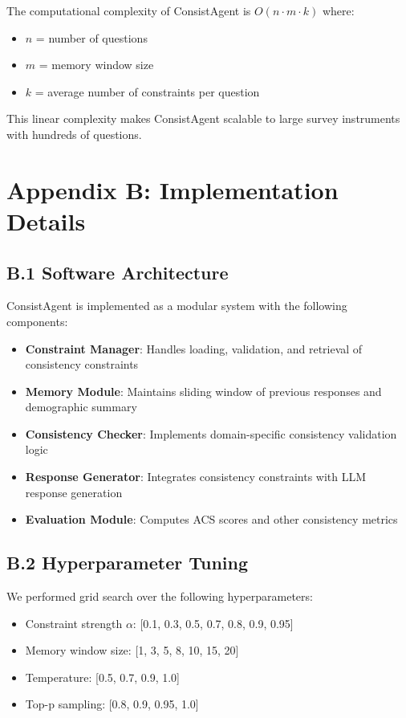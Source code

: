 \documentclass[sigconf, anonymous]{acmart}
\begin{document}
The computational complexity of ConsistAgent is $O(n \cdot m \cdot k)$ where:
\begin{itemize}
    \item $n$ = number of questions
    \item $m$ = memory window size
    \item $k$ = average number of constraints per question
\end{itemize}

This linear complexity makes ConsistAgent scalable to large survey instruments with hundreds of questions.

\newpage
\section*{Appendix B: Implementation Details}

\subsection*{B.1 Software Architecture}

ConsistAgent is implemented as a modular system with the following components:

\begin{itemize}
    \item \textbf{Constraint Manager}: Handles loading, validation, and retrieval of consistency constraints
    \item \textbf{Memory Module}: Maintains sliding window of previous responses and demographic summary
    \item \textbf{Consistency Checker}: Implements domain-specific consistency validation logic
    \item \textbf{Response Generator}: Integrates consistency constraints with LLM response generation
    \item \textbf{Evaluation Module}: Computes ACS scores and other consistency metrics
\end{itemize}

\subsection*{B.2 Hyperparameter Tuning}

We performed grid search over the following hyperparameters:

\begin{itemize}
    \item Constraint strength $\alpha$: [0.1, 0.3, 0.5, 0.7, 0.8, 0.9, 0.95]
    \item Memory window size: [1, 3, 5, 8, 10, 15, 20]
    \item Temperature: [0.5, 0.7, 0.9, 1.0]
    \item Top-p sampling: [0.8, 0.9, 0.95, 1.0]
\end{itemize}
\end{document}
